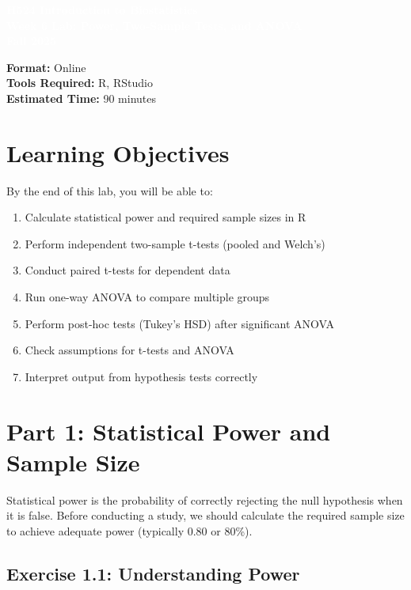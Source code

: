 \documentclass[11pt]{article}
\title{}
\author{}
\date{}
\begin{document}
\begin{tcolorbox}[colback=osaorange,colframe=black,boxrule=2pt,arc=0pt,left=3pt,right=3pt,top=6pt,bottom=6pt,boxsep=2pt]
\centering
\textcolor{white}{\textbf{\Large H524 Introduction to Biostatistics}}\\
\textcolor{white}{\textbf{\Large Week 6 Lab: Power, Two-Sample Tests, and ANOVA}}\\
\textcolor{white}{\textbf{\Large Fall 2025}}
\end{tcolorbox}

\vspace{8pt}

\noindent\textbf{Format:} Online\\
\textbf{Tools Required:} R, RStudio\\
\textbf{Estimated Time:} 90 minutes

\section{Learning Objectives}

By the end of this lab, you will be able to:
\begin{enumerate}
\item Calculate statistical power and required sample sizes in R
\item Perform independent two-sample t-tests (pooled and Welch's)
\item Conduct paired t-tests for dependent data
\item Run one-way ANOVA to compare multiple groups
\item Perform post-hoc tests (Tukey's HSD) after significant ANOVA
\item Check assumptions for t-tests and ANOVA
\item Interpret output from hypothesis tests correctly
\end{enumerate}

\section{Part 1: Statistical Power and Sample Size}

Statistical power is the probability of correctly rejecting the null hypothesis when it is false. Before conducting a study, we should calculate the required sample size to achieve adequate power (typically 0.80 or 80\%).

\subsection{Exercise 1.1: Understanding Power}
\end{document}
